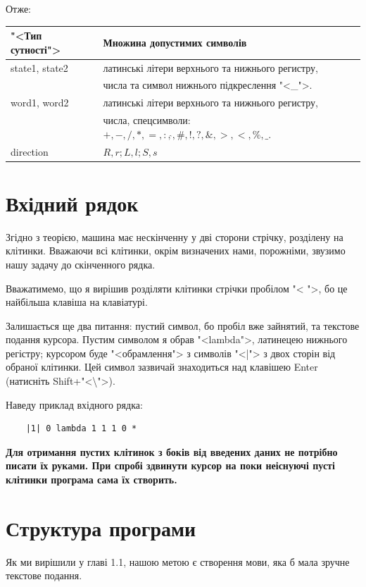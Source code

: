 \documentclass[oneside,final,14pt]{extreport}
\begin{document}
Отже:
		
\vspace{0.2cm}
		
\begin{tabular}{ | l | l | }
	\hline
	"<Тип сутності"> & Множина допустимих символів \\ \hline
	state1, state2 & латинські літери верхнього та нижнього регистру,\\
	& числа та символ нижнього підкреслення "<\_">. \\
	\hline
	word1, word2 & латинські літери верхнього та нижнього регистру,\\ 
	& числа, спецсимволи: $+,-,/,*,=,:,\hat{},\#,!,?,\&,>,<,\%,\_$.  \\
	\hline
	direction & $R,r;L,l;S,s$ \\
	\hline
\end{tabular}

\section{Вхідний рядок}
Згідно з теорією, машина має нескінченну у дві сторони стрічку, розділену на клітинки. Вважаючи всі клітинки, окрім визначених нами, порожніми, звузимо нашу задачу до скінченного рядка.

Вважатимемо, що я вирішив розділяти клітинки стрічки пробілом "< ">, бо це найбільша клавіша на клавіатурі. 

Залишається ще два питання: пустий символ, бо пробіл вже зайнятий, та текстове подання курсора. Пустим символом я обрав "<lambda">, латинецею нижнього регістру; курсором буде "<обрамлення"> з символів "<|"> з двох сторін від обраної клітинки. Цей символ зазвичай знаходиться над клавішею Enter (натисніть Shift+"<\textbackslash{}">).

Наведу приклад вхідного рядка:
\begin{verbatim}
	|1| 0 lambda 1 1 1 0 *
\end{verbatim}

{\bfseries Для отримання пустих клітинок з боків від введених даних не потрібно писати їх руками. При спробі здвинути курсор на поки неіснуючі пусті клітинки програма сама їх створить.}

\section{Структура програми}
Як ми вирішили у главі 1.1, нашою метою є створення мови, яка б мала зручне текстове подання.
\end{document}
